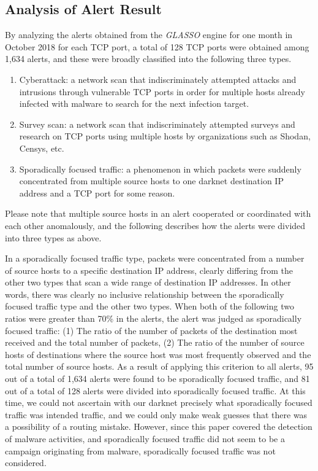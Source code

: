 \documentclass[conference]{IEEEtran}
\begin{document}
\subsection{Analysis of Alert Result}
By analyzing the alerts obtained from the {\it GLASSO} engine for one month in October 2018 for each TCP port, a total of 128 TCP ports were obtained among 1,634 alerts, and these were broadly classified into the following three types.
\begin{enumerate}
  \item Cyberattack: a network scan that indiscriminately attempted attacks and intrusions through vulnerable TCP ports in order for multiple hosts already infected with malware to search for the next infection target.
  \item Survey scan: a network scan that indiscriminately attempted surveys and research on TCP ports using multiple hosts by organizations such as Shodan, Censys, etc.
  \item Sporadically focused traffic: a phenomenon in which packets were suddenly concentrated from multiple source hosts to one darknet destination IP address and a TCP port for some reason.
\end{enumerate}
Please note that multiple source hosts in an alert cooperated or coordinated with each other anomalously, and the following describes how the alerts were divided into three types as above.


In a sporadically focused traffic type, packets were concentrated from a number of source hosts to a specific destination IP address, clearly differing from the other two types that scan a wide range of destination IP addresses.
In other words, there was clearly no inclusive relationship between the sporadically focused traffic type and the other two types.
When both of the following two ratios were greater than 70\% in the alerts, the alert was judged as sporadically focused traffic: (1) The ratio of the number of packets of the destination most received and the total number of packets, (2) The ratio of the number of source hosts of destinations where the source host was most frequently observed and the total number of source hosts.
As a result of applying this criterion to all alerts, 95 out of a total of 1,634 alerts were found to be sporadically focused traffic, and 81 out of a total of 128 alerts were divided into sporadically focused traffic.
At this time, we could not ascertain with our darknet precisely what sporadically focused traffic was intended traffic, and we could only make weak guesses that there was a possibility of a routing mistake.
However, since this paper covered the detection of malware activities, and sporadically focused traffic did not seem to be a campaign originating from malware, sporadically focused traffic was not considered.
\end{document}
